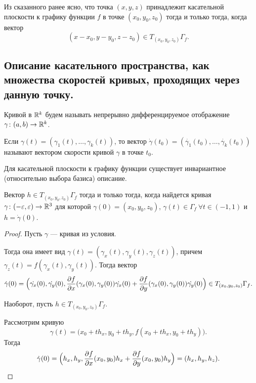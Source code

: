 \documentclass[a4paper]{article}
\theoremstyle{named}
\begin{document}
    Из сказанного ранее ясно, что точка $(x,y,z)$ принадлежит касательной плоскости к графику функции $f$ в точке $(x_0,y_0, z_0)$ тогда и только тогда, когда вектор
    $$(x-x_0,y-y_0,z-z_0)\in T_{(x_0,y_0,z_0)}\Gamma_f.$$
    
    \subsection{Описание касательного пространства, как множества скоростей кривых, проходящих через данную точку.}
    
    \begin{definition*}
        Кривой в $\mathbb{R}^k$ будем называть непрерывно дифференцируемое отображение	$\gamma\colon (a,b)\to \mathbb{R}^k$.
    
        Если $\gamma(t)=(\gamma_1(t),\ldots,\gamma_k(t))$, то вектор $\dot{\gamma}(t_0)=(\dot{\gamma_1}(t_0),\ldots, \dot{\gamma_k}(t_0))$ называют вектором скорости кривой $\gamma$ в точке $t_0$.
    \end{definition*}
    
    Для касательной плоскости к графику функции существует инвариантное (относительно выбора базиса) описание.
    
    \begin{proposal*}
        Вектор $h\in T_{(x_0,y_0,z_0)}\Gamma_f$	тогда и только тогда, когда	найдется кривая $\gamma\colon (-\varepsilon,\varepsilon)\to \mathbb{R}^3$	для которой $\gamma(0)=(x_0,y_0,z_0)$, $\gamma(t)\in \Gamma_f\ \forall t\in(-1,1)$
        и $h=\dot{\gamma}(0)$.
    \end{proposal*}
    
    
    \begin{proof}
        Пусть $\gamma$ --- кривая из условия.
    
        Тогда она имеет вид	$\gamma(t) = (\gamma_x(t), \gamma_y(t), \gamma_z(t))$, причем $\gamma_z(t) = f(\gamma_x(t),\gamma_y(t))$.
        Тогда вектор
        $$
            \dot{\gamma}(0)= \Bigl(\dot{\gamma_x}(0),\dot{\gamma_y}(0),
            \frac{\partial f}{\partial x}(\gamma_x(0),\gamma_y(0))\dot{\gamma_x}(0)+
            \frac{\partial f}{\partial y}(\gamma_x(0),\gamma_y(0))\dot{\gamma_y}(0)\Bigr)\in T_{(x_0,y_0,z_0)}\Gamma_f.
        $$
    
        Наоборот, пусть	$h\in T_{(x_0,y_0,z_0)}\Gamma_f$.
    
        Рассмотрим кривую
        $$\gamma(t)=\bigl(x_0+th_x, y_0+th_y, f(x_0+th_x,y_0+th_y)\bigr).$$
        Тогда
        $$
            \dot{\gamma}(0) = \Bigl(h_x, h_y, \frac{\partial f}{\partial x}(x_0,y_0)h_x+\frac{\partial f}{\partial y}(x_0,y_0)h_y\Bigr)
            = (h_x, h_y, h_z).
        $$
    \end{proof}
\end{document}
